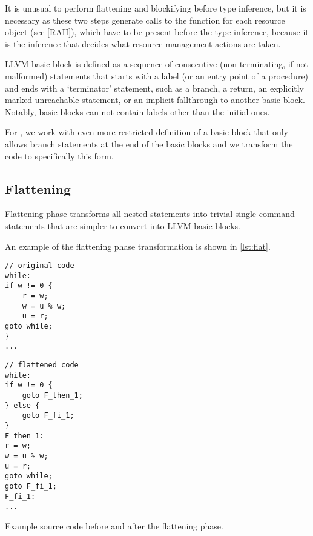 \begin{remark}
    It is unusual to perform flattening and blockifying before type inference, but it is necessary as these two steps generate calls to the  function for each resource object (see \cref{RAII}), which have to be present before the type inference, because it is the inference that decides what resource management actions are taken.
\end{remark}

LLVM basic block is defined as a sequence of consecutive (non-terminating, if not malformed) statements that starts with a label (or an entry point of a procedure) and ends with a `terminator' statement, such as a branch, a return, an explicitly marked unreachable statement, or an implicit fallthrough to another basic block. Notably, basic blocks can not contain labels other than the initial ones.

For \cmm, we work with even more restricted definition of a basic block that only allows branch statements at the end of the basic blocks and we transform the code to specifically this form.

\subsection{Flattening}

Flattening phase transforms all nested statements into trivial single-command statements that are simpler to convert into LLVM basic blocks.

An example of the flattening phase transformation is shown in \cref{lst:flat}.

\begin{codex}
\begin{center}
\begin{minipage}{0.5\linewidth}
\begin{lstlisting}
// original code
while:
if w != 0 {
    r = w;
    w = u % w;
    u = r;
goto while;
}
...\end{lstlisting}
\end{minipage}%
\begin{minipage}{0.5\linewidth}
\begin{lstlisting}
// flattened code
while:
if w != 0 {
    goto F_then_1;
} else {
    goto F_fi_1;
}
F_then_1:
r = w;
w = u % w;
u = r;
goto while;
goto F_fi_1;
F_fi_1:
...\end{lstlisting}
\end{minipage}
\end{center}
\caption{Example source code before and after the flattening phase.}
\label{lst:flat}
\end{codex}


